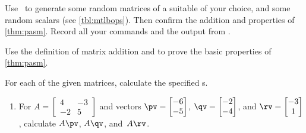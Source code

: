 \begin{exercise}  
Use \script\ to generate some random matrices of a suitable  of your choice, and some random scalars (see \cref{tbl:mtlbops}).
Then confirm the addition and  properties of \cref{thm:pasm}.
Record all your commands and the output from \script.
\end{exercise}


\begin{exercise}  
Use the definition of matrix addition and  to prove the basic properties of \cref{thm:pasm}. 
\end{exercise}







\begin{exercise} \label{ex:matvc} 
For each of the given matrices, calculate the specified s.
\begin{enumerate}
\item For \(A=\begin{bmatrix} 4&-3
\\-2&5 \end{bmatrix}\) and vectors 
\(\pv=\begin{bmatrix} -6\\-5 \end{bmatrix}\), 
\(\qv=\begin{bmatrix} -2\\-4 \end{bmatrix}\), and
\(\rv=\begin{bmatrix} -3\\1 \end{bmatrix}\), 
calculate  \(A\pv\), \(A\qv\), and~\(A\rv\).



\end{enumerate}
\end{exercise}
